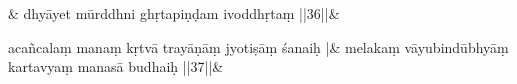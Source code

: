 \documentclass[a4paper,12pt]{article}
\begin{document}

\stanza
{} &
dhyāyet mūrddhni  ghṛtapiṇḍam ivoddhṛtaṃ ||36||\&




\stanza
{}acañcalaṃ manaṃ kṛtvā trayāṇāṃ jyotiṣāṃ śanaiḥ |&
melakaṃ vāyubindūbhyāṃ kartavyaṃ manasā budhaiḥ ||37||\&

\end{document}
